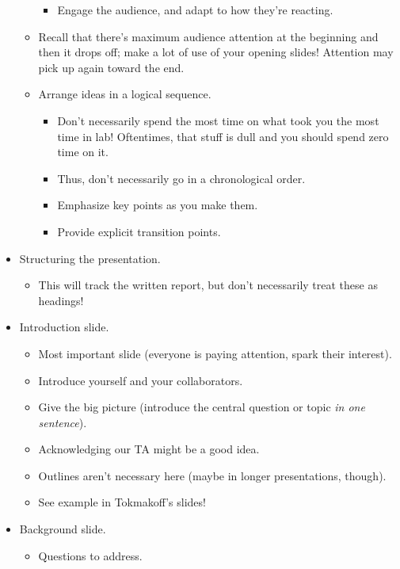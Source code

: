 \documentclass[../notes.tex]{subfiles}
\begin{document}
\begin{itemize}
\begin{itemize}
\begin{itemize}
            \item Engage the audience, and adapt to how they're reacting.
        \end{itemize}
        \item Recall that there's maximum audience attention at the beginning and then it drops off; make a lot of use of your opening slides! Attention may pick up again toward the end.
        \item Arrange ideas in a logical sequence.
        \begin{itemize}
            \item Don't necessarily spend the most time on what took you the most time in lab! Oftentimes, that stuff is dull and you should spend zero time on it.
            \item Thus, don't necessarily go in a chronological order.
            \item Emphasize key points as you make them.
            \item Provide explicit transition points.
        \end{itemize}
    \end{itemize}
    \item Structuring the presentation.
    \begin{itemize}
        \item This will track the written report, but don't necessarily treat these as headings!
    \end{itemize}
    \item Introduction slide.
    \begin{itemize}
        \item Most important slide (everyone is paying attention, spark their interest).
        \item Introduce yourself and your collaborators.
        \item Give the big picture (introduce the central question or topic \emph{in one sentence}).
        \item Acknowledging our TA might be a good idea.
        \item Outlines aren't necessary here (maybe in longer presentations, though).
        \item See example in Tokmakoff's slides!
    \end{itemize}
    \item Background slide.
    \begin{itemize}
        \item Questions to address.
        \begin{itemize}

\end{itemize}
\end{itemize}
\end{itemize}
\end{document}
